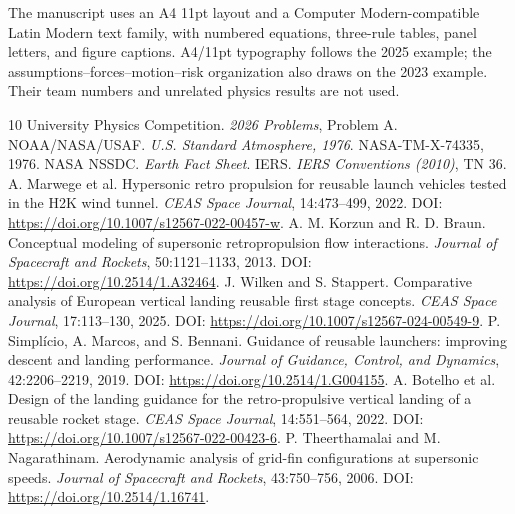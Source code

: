 \documentclass[11pt,a4paper]{article}
\begin{document}
The manuscript uses an A4 11pt layout and a Computer Modern-compatible Latin Modern text family, with numbered equations, three-rule tables, panel letters, and figure captions. A4/11pt typography follows the 2025 example; the assumptions--forces--motion--risk organization also draws on the 2023 example. Their team numbers and unrelated physics results are not used.

\clearpage
{}
{}
\begin{thebibliography}{10}
\small
{} University Physics Competition. \emph{2026 Problems}, Problem A.
 NOAA/NASA/USAF. \emph{U.S. Standard Atmosphere, 1976}. NASA-TM-X-74335, 1976.
 NASA NSSDC. \emph{Earth Fact Sheet}.
 IERS. \emph{IERS Conventions (2010)}, TN 36.
 A. Marwege et al. Hypersonic retro propulsion for reusable launch vehicles tested in the H2K wind tunnel. \emph{CEAS Space Journal}, 14:473--499, 2022. DOI: \url{https://doi.org/10.1007/s12567-022-00457-w}.
 A. M. Korzun and R. D. Braun. Conceptual modeling of supersonic retropropulsion flow interactions. \emph{Journal of Spacecraft and Rockets}, 50:1121--1133, 2013. DOI: \url{https://doi.org/10.2514/1.A32464}.
 J. Wilken and S. Stappert. Comparative analysis of European vertical landing reusable first stage concepts. \emph{CEAS Space Journal}, 17:113--130, 2025. DOI: \url{https://doi.org/10.1007/s12567-024-00549-9}.
 P. Simpl\'{i}cio, A. Marcos, and S. Bennani. Guidance of reusable launchers: improving descent and landing performance. \emph{Journal of Guidance, Control, and Dynamics}, 42:2206--2219, 2019. DOI: \url{https://doi.org/10.2514/1.G004155}.
 A. Botelho et al. Design of the landing guidance for the retro-propulsive vertical landing of a reusable rocket stage. \emph{CEAS Space Journal}, 14:551--564, 2022. DOI: \url{https://doi.org/10.1007/s12567-022-00423-6}.
 P. Theerthamalai and M. Nagarathinam. Aerodynamic analysis of grid-fin configurations at supersonic speeds. \emph{Journal of Spacecraft and Rockets}, 43:750--756, 2006. DOI: \url{https://doi.org/10.2514/1.16741}.
\end{thebibliography}

\clearpage
\end{document}
